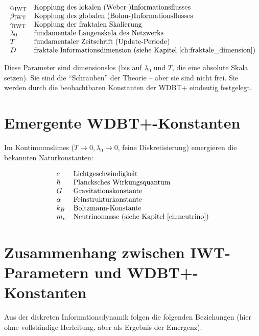 \[
\begin{array}{ll}
\alpha_{\text{IWT}} & \text{Kopplung des lokalen (Weber-)Informationsflusses} \\
\beta_{\text{IWT}} & \text{Kopplung des globalen (Bohm-)Informationsflusses} \\
\gamma_{\text{IWT}} & \text{Kopplung der fraktalen Skalierung} \\
\lambda_0 & \text{fundamentale Längenskala des Netzwerks} \\
T & \text{fundamentaler Zeitschrift (Update-Periode)} \\
D & \text{fraktale Informationsdimension (siehe Kapitel~\ref{ch:fraktale_dimension})}
\end{array}
\]

Diese Parameter sind dimensionslos (bis auf \( \lambda_0 \) und \( T \), die eine absolute Skala setzen). Sie sind die \enquote{Schrauben} der Theorie – aber sie sind nicht frei. Sie werden durch die beobachtbaren Konstanten der WDBT+ eindeutig festgelegt.

\section{Emergente WDBT+-Konstanten}
\label{sec:wdbt_konstanten}

Im Kontinuumslimes (\( T \to 0, \lambda_0 \to 0 \), feine Diskretisierung) emergieren die bekannten Naturkonstanten:

\[
\begin{array}{ll}
c & \text{Lichtgeschwindigkeit} \\
\hbar & \text{Plancksches Wirkungsquantum} \\
G & \text{Gravitationskonstante} \\
\alpha & \text{Feinstrukturkonstante} \\
k_B & \text{Boltzmann-Konstante} \\
m_\nu & \text{Neutrinomasse (siehe Kapitel~\ref{ch:neutrino})}
\end{array}
\]

\section{Zusammenhang zwischen IWT-Parametern und WDBT+-Konstanten}
\label{sec:parameter_relationen}

Aus der diskreten Informationsdynamik folgen die folgenden Beziehungen (hier ohne vollständige Herleitung, aber als Ergebnis der Emergenz):


